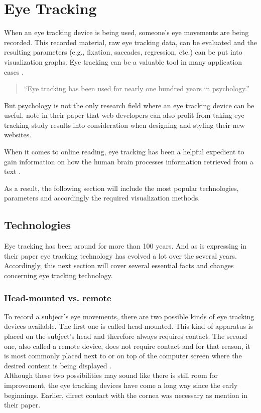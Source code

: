 \section{Eye Tracking}
\label{section:EyeTracking}
When an eye tracking device is being used, someone's eye movements are being recorded. This recorded material, raw eye tracking data, can be evaluated and the resulting parameters (e.g., fixation, saccades, regression, etc.) can be put into visualization graphs. Eye tracking can be a valuable tool in many application cases \autocite[]{goldberg2002eye, poole2006eye, beymer2007eye}.

\begin{quote}
``Eye tracking has been used for nearly one hundred years in psychology.''
\autocite[1]{schiessl2003eye}
\end{quote}

But psychology is not the only research field where an eye tracking device can be useful. \textcite[]{buscher2009you} note in their paper that web developers can also profit from taking eye tracking study results into consideration when designing and styling their new websites. 

When it comes to online reading, eye tracking has been a helpful expedient to gain information on how the human brain processes information retrieved from a text \autocite[]{schiessl2003eye}.

As a result, the following section will include the most popular technologies, parameters and accordingly the required visualization methods. 

\subsection{Technologies}
\label{subsection:Technologies}
Eye tracking has been around for more than 100 years. And as \textcite[]{poole2006eye} is expressing in their paper eye tracking technology has evolved a lot over the several years.
Accordingly, this next section will cover several essential facts and changes concerning eye tracking technology.

\subsubsection{Head-mounted vs. remote}
To record a subject's eye movements, there are two possible kinds of eye tracking devices available. The first one is called head-mounted. This kind of apparatus is placed on the subject's head and therefore always requires contact. 
The second one, also called a remote device, does not require contact and for that reason, it is most commonly placed next to or on top of the computer screen where the desired content is being displayed \autocite[]{jacob2003eye, schiessl2003eye}.\\
Although these two possibilities may sound like there is still room for improvement, the eye tracking devices have come a long way since the early beginnings. Earlier, direct contact with the cornea was necessary as \textcite[]{jacob2003eye} mention in their paper.

